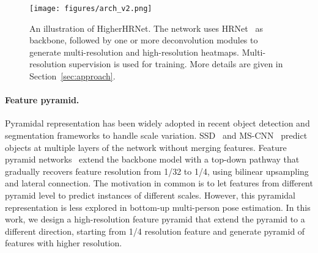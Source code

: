\documentclass[10pt,twocolumn,letterpaper]{article}
\begin{document}
\begin{figure*}[t]
    \centering
    \texttt{[image: figures/arch\_v2.png]}
    \caption{An illustration of HigherHRNet. The network uses HRNet~\cite{sun2019deep,WangSCJDZLMTWLX19} as backbone, followed by one or more deconvolution modules to generate multi-resolution and high-resolution heatmaps. Multi-resolution supervision is used for training. More details are given in Section~\ref{sec:approach}.}
    \vspace{-4mm}
    \label{fig:hrnet}
\end{figure*}
\vspace{-4mm}
\paragraph{Feature pyramid.} Pyramidal representation has been widely adopted in recent object detection and segmentation frameworks to handle scale variation. SSD~\cite{liu2016ssd} and MS-CNN~\cite{cai2016unified} predict objects at multiple layers of the network without merging features. Feature pyramid networks~\cite{lin2017feature} extend the backbone model with a top-down pathway that gradually recovers feature resolution from 1/32 to 1/4, using bilinear upsampling and lateral connection. The motivation in common is to let features from different pyramid level to predict instances of different scales. However, this pyramidal representation is less explored in bottom-up multi-person pose estimation. In this work, we design a high-resolution feature pyramid that extend the pyramid to a different direction, starting from 1/4 resolution feature and generate pyramid of features with higher resolution.
\vspace{-4mm}
\end{document}
